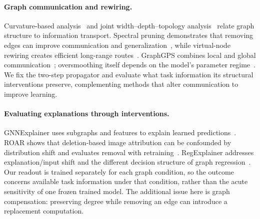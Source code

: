 \paragraph{Graph communication and rewiring.}
Curvature-based analysis~\cite{curvature2022} and joint width--depth--topology
analysis~\cite{oversquashing2023} relate graph structure to information
transport. Spectral pruning demonstrates that removing edges can improve
communication and generalization~\cite{pruning2024}, while virtual-node
rewiring creates efficient long-range routes~\cite{virtual2024}.
GraphGPS combines local and global communication~\cite{graphgps2022};
oversmoothing itself depends on the model's parameter
regime~\cite{phase2024}. We fix the two-step propagator and evaluate what task information its
structural interventions preserve, complementing methods that alter
communication to improve learning.

\paragraph{Evaluating explanations through interventions.}
GNNExplainer uses subgraphs and features to explain learned
predictions~\cite{gnnexplainer2019}. ROAR shows that deletion-based image
attribution can be confounded by distribution shift and evaluates removal
with retraining~\cite{roar2019}. RegExplainer addresses explanation/input
shift and the different decision structure of graph
regression~\cite{regexplainer2024}. Our readout is trained separately for
each graph condition, so the outcome concerns available task information
under that condition, rather than the acute sensitivity of one frozen
trained model. The additional issue here is graph compensation: preserving
degree while removing an edge can introduce a replacement computation.
